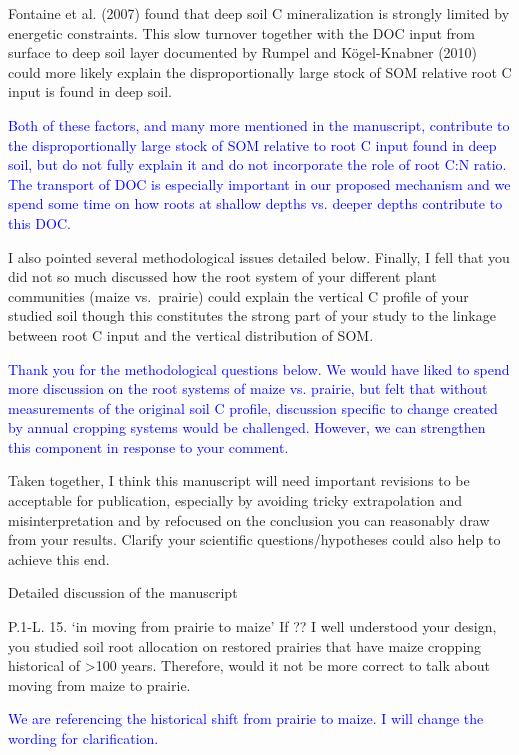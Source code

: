 \documentclass[]{article}
\begin{document}
Fontaine et al. (2007) found that deep soil C mineralization is strongly
limited by energetic constraints. This slow turnover together with the
DOC input from surface to deep soil layer documented by Rumpel and
Kögel-Knabner (2010) could more likely explain the disproportionally
large stock of SOM relative root C input is found in deep soil.

\textcolor{blue}{Both of these factors, and many more mentioned in the manuscript, contribute to the disproportionally large stock of SOM relative to root C input found in deep soil, but do not fully explain it and do not incorporate the role of root C:N ratio. The transport of DOC is especially important in our proposed mechanism and we spend some time on how roots at shallow depths vs. deeper depths contribute to this DOC.}

I also pointed several methodological issues detailed below. Finally, I
fell that you did not so much discussed how the root system of your
different plant communities (maize vs.~prairie) could explain the
vertical C profile of your studied soil though this constitutes the
strong part of your study to the linkage between root C input and the
vertical distribution of SOM.

\textcolor{blue}{Thank you for the methodological questions below. We would have liked to spend more discussion on the root systems of maize vs. prairie, but felt that without measurements of the original soil C profile, discussion specific to change created by annual cropping systems would be challenged. However, we can strengthen this component in response to your comment.}

Taken together, I think this manuscript will need important revisions to
be acceptable for publication, especially by avoiding tricky
extrapolation and misinterpretation and by refocused on the conclusion
you can reasonably draw from your results. Clarify your scientific
questions/hypotheses could also help to achieve this end.

Detailed discussion of the manuscript

P.1-L. 15. `in moving from prairie to maize' If ?? I well understood
your design, you studied soil root allocation on restored prairies that
have maize cropping historical of \textgreater{}100 years. Therefore,
would it not be more correct to talk about moving from maize to prairie.

\textcolor{blue}{We are referencing the historical shift from prairie to maize. I will change the wording for clarification.}
\end{document}
